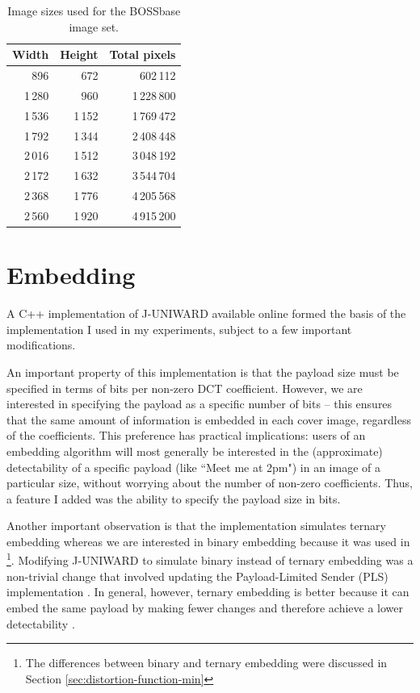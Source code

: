 \documentclass[11pt,a4paper,twoside,openright]{report}
\begin{document}
\begin{table}[htbp]
    \begin{center}
        \begin{tabular}{ r  r | r}
        Width & Height & Total pixels \\ \hline
        896 & 672 & 602\,112 \\
        1\,280 & 960 & 1\,228\,800 \\
        1\,536 & 1\,152 & 1\,769\,472 \\
        1\,792 & 1\,344 & 2\,408\,448 \\
        2\,016 & 1\,512 & 3\,048\,192 \\
        2\,172 & 1\,632 & 3\,544\,704 \\
        2\,368 & 1\,776 & 4\,205\,568 \\
        2\,560 & 1\,920 & 4\,915\,200 \\
        \end{tabular}
        \caption{Image sizes used for the BOSSbase image set.}
        \label{bossbase-sizes}
    \end{center}
\end{table}


\section{Embedding} \label{sec:juniward-impl}

A C++ implementation of J-UNIWARD available online \cite{binghamton-embedding} formed the basis of the implementation I used in my experiments, subject to a few important modifications.

An important property of this implementation is that the payload size must be specified in terms of bits per non-zero DCT coefficient. However, we are interested in specifying the payload as a specific number of bits -- this ensures that the same amount of information is embedded in each cover image, regardless of the coefficients. This preference has practical implications: users of an embedding algorithm will most generally be interested in the (approximate) detectability of a specific payload (like ``Meet me at 2pm") in an image of a particular size, without worrying about the number of non-zero coefficients. Thus, a feature I added was the ability to specify the payload size in bits.

Another important observation is that the implementation simulates ternary embedding whereas we are interested in binary embedding because it was used in \cite{2008-paper}\footnote{The differences between binary and ternary embedding were discussed in Section \ref{sec:distortion-function-min}}. Modifying J-UNIWARD to simulate binary instead of ternary embedding was a non-trivial change that involved updating the Payload-Limited Sender (PLS) implementation \cite{non-binary-embedding}. In general, however, ternary embedding is better because it can embed the same payload by making fewer changes and therefore achieve a lower detectability \cite{non-binary-embedding}.
\end{document}
